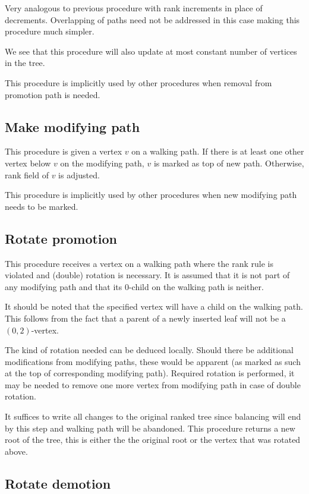 Very analogous to previous procedure with rank increments in place of decrements. Overlapping of paths need not be addressed in this case making this procedure much simpler.

We see that this procedure will also update at most constant number of vertices in the tree.

This procedure is implicitly used by other procedures when removal from promotion path is needed.

\subsection{Make modifying path}

This procedure is given a vertex $v$ on a walking path. If there is at least one other vertex below $v$ on the modifying path, $v$ is marked as top of new path. Otherwise, rank field of $v$ is adjusted. 

This procedure is implicitly used by other procedures when new modifying path needs to be marked.

\subsection{Rotate promotion}

This procedure receives a vertex on a walking path where the rank rule is violated and (double) rotation is necessary. It is assumed that it is not part of any modifying path and that its $0$-child on the walking path is neither. 

It should be noted that the specified vertex will have a child on the walking path. This follows from the fact that a parent of a newly inserted leaf will not be a $(0,2)$-vertex.

The kind of rotation needed can be deduced locally. Should there be additional modifications from modifying paths, these would be apparent (as marked as such at the top of corresponding modifying path). Required rotation is performed, it may be needed to remove one more vertex from modifying path in case of double rotation.

It suffices to write all changes to the original ranked tree since balancing will end by this step and walking path will be abandoned. 
This procedure returns a new root of the tree, this is either the the original root or the vertex that was rotated above.

\subsection{Rotate demotion}

